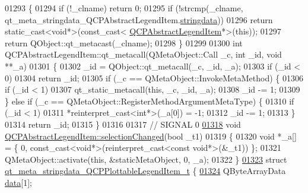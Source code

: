 \begin{DoxyCode}
01293 \{
01294     \textcolor{keywordflow}{if} (!\_clname) \textcolor{keywordflow}{return} 0;
01295     \textcolor{keywordflow}{if} (!strcmp(\_clname, qt\_meta\_stringdata\_QCPAbstractLegendItem.\hyperlink{a00067_a007f69edf60f3475c27481b80fb00e7f}{stringdata}))
01296         \textcolor{keywordflow}{return} \textcolor{keyword}{static\_cast<}\textcolor{keywordtype}{void}*\textcolor{keyword}{>}(\textcolor{keyword}{const\_cast<} \hyperlink{a00023}{QCPAbstractLegendItem}*\textcolor{keyword}{>}(\textcolor{keyword}{this}));
01297     \textcolor{keywordflow}{return} QObject::qt\_metacast(\_clname);
01298 \}
01299 
01300 \textcolor{keywordtype}{int} QCPAbstractLegendItem::qt\_metacall(QMetaObject::Call \_c, \textcolor{keywordtype}{int} \_id, \textcolor{keywordtype}{void} **\_a)
01301 \{
01302     \_id = QObject::qt\_metacall(\_c, \_id, \_a);
01303     \textcolor{keywordflow}{if} (\_id < 0)
01304         \textcolor{keywordflow}{return} \_id;
01305     \textcolor{keywordflow}{if} (\_c == QMetaObject::InvokeMetaMethod) \{
01306         \textcolor{keywordflow}{if} (\_id < 1)
01307             qt\_static\_metacall(\textcolor{keyword}{this}, \_c, \_id, \_a);
01308         \_id -= 1;
01309     \} \textcolor{keywordflow}{else} \textcolor{keywordflow}{if} (\_c == QMetaObject::RegisterMethodArgumentMetaType) \{
01310         \textcolor{keywordflow}{if} (\_id < 1)
01311             *\textcolor{keyword}{reinterpret\_cast<}\textcolor{keywordtype}{int}*\textcolor{keyword}{>}(\_a[0]) = -1;
01312         \_id -= 1;
01313     \}
01314     \textcolor{keywordflow}{return} \_id;
01315 \}
01316 
01317 \textcolor{comment}{// SIGNAL 0}
\hypertarget{a00067_source_l01318}{}\hyperlink{a00023_a7cb61fdfbaf69c590bacb8f9e7099d9e}{01318} \textcolor{keywordtype}{void} \hyperlink{a00023_a7cb61fdfbaf69c590bacb8f9e7099d9e}{QCPAbstractLegendItem::selectionChanged}(\textcolor{keywordtype}{bool} \_t1)
01319 \{
01320     \textcolor{keywordtype}{void} *\_a[] = \{ 0, \textcolor{keyword}{const\_cast<}\textcolor{keywordtype}{void}*\textcolor{keyword}{>}(\textcolor{keyword}{reinterpret\_cast<}\textcolor{keyword}{const }\textcolor{keywordtype}{void}*\textcolor{keyword}{>}(&\_t1)) \};
01321     QMetaObject::activate(\textcolor{keyword}{this}, &staticMetaObject, 0, \_a);
01322 \}
\hypertarget{a00067_source_l01323}{}\hyperlink{a00067}{01323} \textcolor{keyword}{struct }\hyperlink{a00067_d3/de5/a00209}{qt\_meta\_stringdata\_QCPPlottableLegendItem\_t} \{
\hypertarget{a00067_source_l01324}{}\hyperlink{a00067_a56d928faacdea012d9b501b879ef98a8}{01324}     QByteArrayData \hyperlink{a00067_a56d928faacdea012d9b501b879ef98a8}{data}[1];

\end{DoxyCode}
